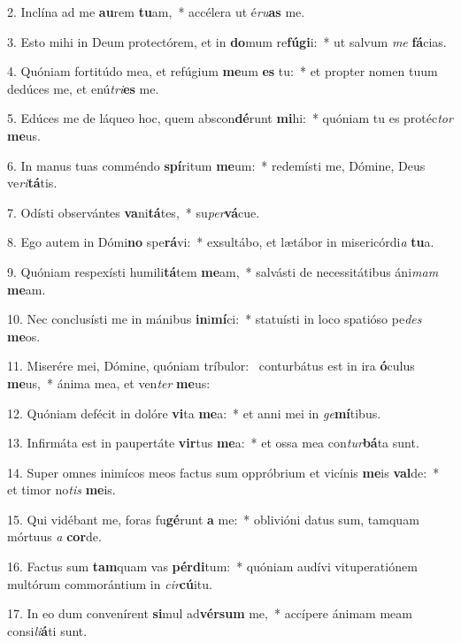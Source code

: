 2. Inclína ad me \textbf{au}rem \textbf{tu}am,~*  accélera ut é\textit{ru}\textbf{as} me.\

3. Esto mihi in Deum protectórem, et in \textbf{do}mum re\textbf{fú}\textbf{gi}i:~*  ut salvum \textit{me} \textbf{fá}cias.\

4. Quóniam fortitúdo mea, et refúgium \textbf{me}um \textbf{es} tu:~*  et propter nomen tuum dedúces me, et enú\textit{tri}\textbf{es} me.\

5. Edúces me de láqueo hoc, quem abscon\textbf{dé}runt \textbf{mi}hi:~*  quóniam tu es protéc\textit{tor} \textbf{me}us.\

6. In manus tuas comméndo \textbf{spí}ritum \textbf{me}um:~*  redemísti me, Dómine, Deus ve\textit{ri}\textbf{tá}tis.\

7. Odísti observántes \textbf{va}ni\textbf{tá}tes,~*  su\textit{per}\textbf{vá}cue.\

8. Ego autem in Dómi\textbf{no} spe\textbf{rá}vi:~*  exsultábo, et lætábor in misericórdi\textit{a} \textbf{tu}a.\

9. Quóniam respexísti humili\textbf{tá}tem \textbf{me}am,~*  salvásti de necessitátibus áni\textit{mam} \textbf{me}am.\

10. Nec conclusísti me in mánibus \textbf{in}i\textbf{mí}ci:~*  statuísti in loco spatióso pe\textit{des} \textbf{me}os.\

11. Miserére mei, Dómine, quóniam tríbulor: \dag\  conturbátus est in ira \textbf{ó}culus \textbf{me}us,~*  ánima mea, et ven\textit{ter} \textbf{me}us:\

12. Quóniam defécit in dolóre \textbf{vi}ta \textbf{me}a:~*  et anni mei in \textit{ge}\textbf{mí}tibus.\

13. Infirmáta est in paupertáte \textbf{vir}tus \textbf{me}a:~*  et ossa mea con\textit{tur}\textbf{bá}ta sunt.\

14. Super omnes inimícos meos factus sum oppróbrium et vicínis \textbf{me}is \textbf{val}de:~*  et timor no\textit{tis} \textbf{me}is.\

15. Qui vidébant me, foras fu\textbf{gé}runt \textbf{a} me:~*  oblivióni datus sum, tamquam mórtuus \textit{a} \textbf{cor}de.\

16. Factus sum \textbf{tam}quam vas \textbf{pér}\textbf{di}tum:~*  quóniam audívi vituperatiónem multórum commorántium in \textit{cir}\textbf{cú}itu.\

17. In eo dum convenírent \textbf{si}mul ad\textbf{vér}\textbf{sum} me,~*  accípere ánimam meam consi\textit{li}\textbf{á}ti sunt.\

